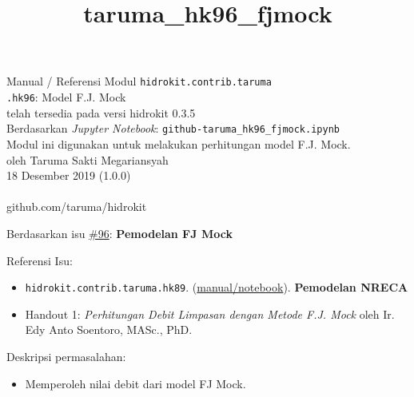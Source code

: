 \documentclass[11pt]{article}
\title{taruma\_hk96\_fjmock}
\providecommand{\tightlist}{%
      \setlength{\itemsep}{0pt}\setlength{\parskip}{0pt}}
\begin{document}
  
	\begin{titlepage}
		\vspace*{\fill}
		\begin{center}
 		\normalsize Manual / Referensi Modul \texttt{hidrokit.contrib.taruma}\\
		\huge \texttt{.hk96}: Model F.J. Mock\\ 
		\small telah tersedia pada versi hidrokit 0.3.5 \\[0.2cm]
      	\small Berdasarkan \emph{Jupyter Notebook}: \texttt{github-taruma\_hk96\_fjmock.ipynb} \\[0.5cm]
      	\small Modul ini digunakan untuk melakukan perhitungan model F.J. Mock. \\[0.5cm]
		\normalsize oleh Taruma Sakti Megariansyah\\[0.5cm]
      	\normalsize 18 Desember 2019 (1.0.0)\\[1cm]
    	\\
      	\normalsize github.com/taruma/hidrokit
		\end{center}
    	\vspace*{\fill}
	\end{titlepage}
    
    

    
    

    Berdasarkan isu
\href{https://github.com/taruma/hidrokit/issues/96}{\#96}:
\textbf{Pemodelan FJ Mock}

Referensi Isu:

\begin{itemize}
\tightlist
\item
  \texttt{hidrokit.contrib.taruma.hk89}.
  (\href{https://gist.github.com/taruma/1502a7aa67cf074969d806cd3ffdf35c}{manual/notebook}).
  \textbf{Pemodelan NRECA}
\item
  Handout 1: \emph{Perhitungan Debit Limpasan dengan Metode F.J. Mock}
  oleh Ir. Edy Anto Soentoro, MASc., PhD.
\end{itemize}

Deskripsi permasalahan:

\begin{itemize}
\tightlist
\item
  Memperoleh nilai debit dari model FJ Mock.
\end{itemize}
\end{document}
